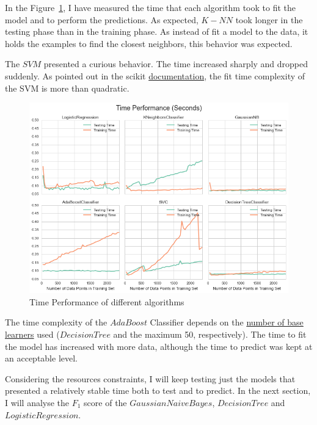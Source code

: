 \documentclass[a4paper]{article}
\begin{document}
In the Figure~\ref{fig:timetest}, I have measured the time that each algorithm took to fit the model and to perform the predictions. As expected, $K-NN$ took longer in the testing phase than in the training phase. As instead of  fit a model to the data, it holds the examples to find the closest neighbors, this behavior was expected. 

The $SVM$ presented a curious behavior. The time increased sharply and dropped suddenly. As pointed out in the scikit \href{http://scikit-learn.org/stable/modules/svm.html#complexity}{documentation}, the fit time complexity of the SVM is more than quadratic.

\begin{figure}[ht!]
\centering
\includegraphics[width=1\textwidth]{figures/timePerformance.png}
\caption{\label{fig:timetest}Time Performance of different algorithms}
\end{figure}


The time complexity of the $AdaBoost$ Classifier depends on the \href{http://stackoverflow.com/questions/22397485/what-is-the-o-runtime-complexity-of-adaboost}{number of base learners} used ($Decision Tree$ and the maximum 50, respectively). The time to fit the model has increased with more data, although the time to predict was kept at an acceptable level.

Considering the resources constraints, I will keep testing just the models that presented a relatively stable time both to test and to predict. In the next section, I will analyse the $F_1$ score of the $Gaussian Naive Bayes$, $Decision Tree$ and $Logistic Regression$.
\end{document}
